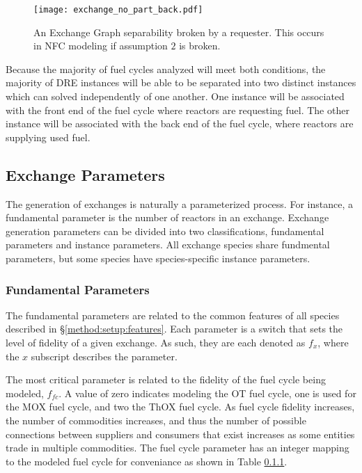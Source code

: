 \begin{figure}
  \begin{center}
    \texttt{[image: exchange\_no\_part\_back.pdf]}
    \caption[]{
      \label{fig:no_part_back}
      An Exchange Graph separability broken by a requester. This occurs in NFC
      modeling if assumption $2$ is broken.}
  \end{center}
\end{figure}

Because the majority of fuel cycles analyzed will meet both conditions, the
majority of DRE instances will be able to be separated into two distinct
instances which can solved independently of one another. One instance will be
associated with the front end of the fuel cycle where reactors are requesting
fuel. The other instance will be associated with the back end of the fuel cycle,
where reactors are supplying used fuel.

\subsection{Exchange Parameters}\label{method:setup:params}

The generation of exchanges is naturally a parameterized process. For instance,
a fundamental parameter is the number of reactors in an exchange. Exchange
generation parameters can be divided into two classifications, fundamental
parameters and instance parameters. All exchange species share fundmental
parameters, but some species have species-specific instance parameters.

\subsubsection{Fundamental Parameters}

The fundamental parameters are related to the common features of all species
described in \S \ref{method:setup:features}. Each parameter is a switch that
sets the level of fidelity of a given exchange. As such, they are each denoted
as $f_x$, where the $x$ subscript describes the parameter.

The most critical parameter is related to the fidelity of the fuel cycle being
modeled, $f_{fc}$. A value of zero indicates modeling the OT fuel cycle, one is
used for the MOX fuel cycle, and two the ThOX fuel cycle. As fuel cycle fidelity
increases, the number of commodities increases, and thus the number of possible
connections between suppliers and consumers that exist increases as some
entities trade in multiple commodities. The fuel cycle parameter has an integer
mapping to the modeled fuel cycle for conveniance as shown in Table \ref{}.

